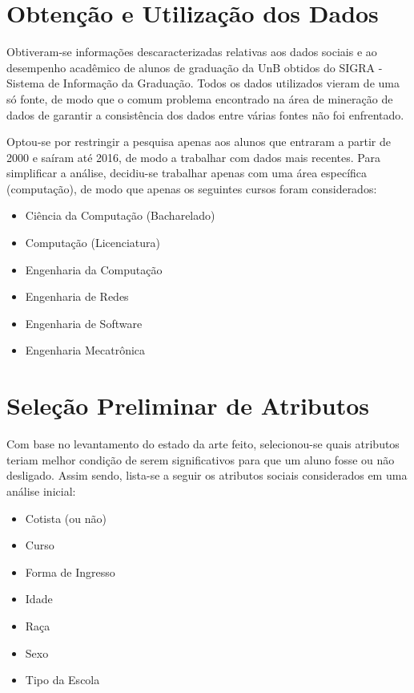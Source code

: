 \section{Obtenção e Utilização dos Dados}
Obtiveram-se informações descaracterizadas relativas aos dados sociais e ao
desempenho acadêmico de alunos de graduação da UnB obtidos do \acrshort{SIGRA} -
Sistema de Informação da Graduação. Todos os dados utilizados vieram
de uma só fonte, de modo que o comum problema encontrado na área de mineração de
dados de garantir a consistência dos dados entre várias fontes não foi enfrentado. 
\par Optou-se por restringir a pesquisa apenas aos alunos que entraram a partir de
2000 e saíram até 2016, de modo a trabalhar com dados mais recentes. 
Para simplificar a análise, decidiu-se trabalhar apenas com uma área
específica (computação), de modo que apenas os seguintes cursos foram considerados: 
\begin{itemize}
    \item Ciência da Computação (Bacharelado)
    \item Computação (Licenciatura)
    \item Engenharia da Computação 
    \item Engenharia de Redes
    \item Engenharia de Software
    \item Engenharia Mecatrônica
\end{itemize}

\section{Seleção Preliminar de Atributos}
Com base no levantamento do estado da arte feito, selecionou-se quais atributos
teriam melhor condição de serem significativos para que um aluno fosse ou não
desligado. Assim sendo, lista-se a seguir os atributos sociais considerados em uma análise
inicial:
\begin{itemize}
        \item Cotista (ou não)
        \item Curso
        \item Forma de Ingresso
        \item Idade
        \item Raça
        \item Sexo
        \item Tipo da Escola 
\end{itemize}

